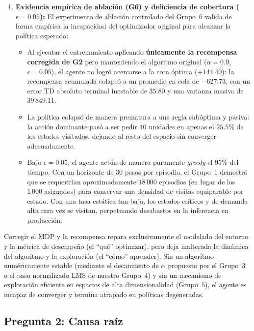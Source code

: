\documentclass[11pt,letterpaper]{article}
\begin{document}
\begin{enumerate}
    \item \textbf{Evidencia empírica de ablación (G6) y deficiencia de cobertura ($\epsilon = 0.05$):}
    El experimento de ablación controlado del Grupo~6 valida de forma empírica la incapacidad del optimizador original para alcanzar la política esperada:
    \begin{itemize}
        \item Al ejecutar el entrenamiento aplicando \textbf{únicamente la recompensa corregida de G2} pero manteniendo el algoritmo original ($\alpha = 0.9$, $\epsilon = 0.05$), el agente no logró acercarse a la cota óptima ($+144.40$): la recompensa acumulada colapsó a un promedio en cola de $-627.73$, con un error TD absoluto terminal inestable de $35.80$ y una varianza masiva de $39\,849.11$.
        \item La política colapsó de manera prematura a una regla subóptima y pasiva: la acción dominante pasó a ser pedir $10$ unidades en apenas el $25.5\%$ de los estados visitados, dejando al resto del espacio sin converger adecuadamente.
        \item Bajo $\epsilon = 0.05$, el agente actúa de manera puramente \textit{greedy} el $95\%$ del tiempo. Con un horizonte de $30$ pasos por episodio, el Grupo~1 demostró que se requerirían aproximadamente $18\,000$ episodios (en lugar de los $1\,000$ asignados) para conservar una densidad de visitas equiparable por estado. Con una tasa estática tan baja, los estados críticos y de demanda alta rara vez se visitan, perpetuando desabastos en la inferencia en producción.
    \end{itemize}
\end{enumerate}

Corregir el MDP y la recompensa repara exclusivamente el modelado del entorno y la métrica de desempeño (el ``qué'' optimizar), pero deja inalterada la dinámica del algoritmo y la exploración (el ``cómo'' aprender). Sin un algoritmo numéricamente estable (mediante el decaimiento de $\alpha$ propuesto por el Grupo~3 o el paso normalizado LMS de nuestro Grupo~4) y sin un mecanismo de exploración eficiente en espacios de alta dimensionalidad (Grupo~5), el agente es incapaz de converger y termina atrapado en políticas degeneradas.

\vspace{4cm}

\subsection{Pregunta 2: Causa raíz}
\end{document}
